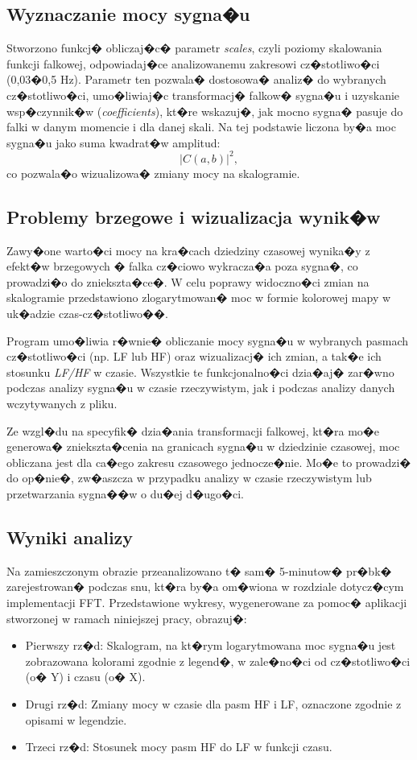 \subsection{Wyznaczanie mocy sygna�u}
Stworzono funkcj� obliczaj�c� parametr \textit{scales}, czyli poziomy
skalowania funkcji falkowej, odpowiadaj�ce analizowanemu zakresowi
cz�stotliwo�ci (0,03�0,5 Hz). Parametr ten pozwala� dostosowa� analiz� do
wybranych cz�stotliwo�ci, umo�liwiaj�c transformacj� falkow� sygna�u i
uzyskanie wsp�czynnik�w (\textit{coefficients}), kt�re wskazuj�, jak mocno
sygna� pasuje do falki w danym momencie i dla danej skali. Na tej podstawie
liczona by�a moc sygna�u jako suma kwadrat�w amplitud:
\[
    |C(a,b)|^2,
\]
co pozwala�o wizualizowa� zmiany mocy na skalogramie.

\subsection{Problemy brzegowe i wizualizacja wynik�w}
Zawy�one warto�ci mocy na kra�cach dziedziny czasowej wynika�y z efekt�w
brzegowych � falka cz�ciowo wykracza�a poza sygna�, co prowadzi�o do
zniekszta�ce�. W celu poprawy widoczno�ci zmian na skalogramie przedstawiono
zlogarytmowan� moc w formie kolorowej mapy w uk�adzie czas-cz�stotliwo��.

Program umo�liwia r�wnie� obliczanie mocy sygna�u w wybranych pasmach
cz�stotliwo�ci (np. LF lub HF) oraz wizualizacj� ich zmian, a tak�e ich
stosunku \textit{LF/HF} w czasie. Wszystkie te funkcjonalno�ci dzia�aj� zar�wno
podczas analizy sygna�u w czasie rzeczywistym, jak i podczas analizy danych
wczytywanych z pliku.

Ze wzgl�du na specyfik� dzia�ania transformacji falkowej, kt�ra mo�e generowa�
zniekszta�cenia na granicach sygna�u w dziedzinie czasowej, moc obliczana jest
dla ca�ego zakresu czasowego jednocze�nie. Mo�e to prowadzi� do op�nie�,
zw�aszcza w przypadku analizy w czasie rzeczywistym lub przetwarzania sygna��w
o du�ej d�ugo�ci.

\subsection{Wyniki analizy}
Na zamieszczonym obrazie przeanalizowano t� sam� 5-minutow� pr�bk�
zarejestrowan� podczas snu, kt�ra by�a om�wiona w rozdziale dotycz�cym
implementacji FFT. Przedstawione wykresy, wygenerowane za pomoc� aplikacji
stworzonej w ramach niniejszej pracy, obrazuj�:
\begin{itemize}
    \item {Pierwszy rz�d:} Skalogram, na kt�rym logarytmowana moc sygna�u jest zobrazowana kolorami zgodnie z legend�, w zale�no�ci od cz�stotliwo�ci (o� Y) i czasu (o� X).
    \item {Drugi rz�d:} Zmiany mocy w czasie dla pasm HF i LF, oznaczone zgodnie z opisami w legendzie.
    \item {Trzeci rz�d:} Stosunek mocy pasm HF do LF w funkcji czasu.
\end{itemize}

